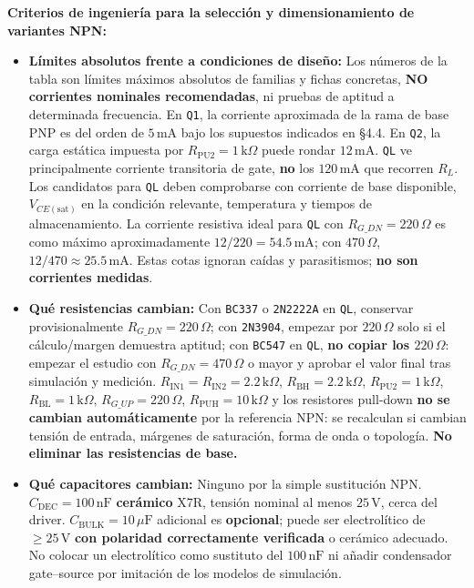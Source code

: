 \documentclass[10pt, a4paper, landscape]{article}
\begin{document}
\vspace{0.2cm}
\noindent
\textbf{Criterios de ingeniería para la selección y dimensionamiento de variantes NPN:}
\begin{itemize}[noitemsep, topsep=3pt]
    \item \textbf{Límites absolutos frente a condiciones de diseño:} Los números de la tabla son límites máximos absolutos de familias y fichas concretas, \textbf{NO corrientes nominales recomendadas}, ni pruebas de aptitud a determinada frecuencia. En \texttt{Q1}, la corriente aproximada de la rama de base PNP es del orden de $5\,\text{mA}$ bajo los supuestos indicados en \S 4.4. En \texttt{Q2}, la carga estática impuesta por $R_{\text{PU2}}=1\,\text{k}\Omega$ puede rondar $12\,\text{mA}$. \texttt{QL} ve principalmente corriente transitoria de gate, \textbf{no} los $120\,\text{mA}$ que recorren $R_L$. Los candidatos para \texttt{QL} deben comprobarse con corriente de base disponible, $V_{CE(\text{sat})}$ en la condición relevante, temperatura y tiempos de almacenamiento. La corriente resistiva ideal para \texttt{QL} con $R_{G\_DN}=220\,\Omega$ es como máximo aproximadamente $12/220 = 54.5\,\text{mA}$; con \textbf{$470\,\Omega$}, $12/470 \approx 25.5\,\text{mA}$. Estas cotas ignoran caídas y parasitismos; \textbf{no son corrientes medidas}.
    \item \textbf{Qué resistencias cambian:} Con \texttt{BC337} o \texttt{2N2222A} en \texttt{QL}, conservar provisionalmente $R_{G\_DN}=220\,\Omega$; con \texttt{2N3904}, empezar por $220\,\Omega$ solo si el cálculo/margen demuestra aptitud; con \texttt{BC547} en \texttt{QL}, \textbf{no copiar los $220\,\Omega$}: empezar el estudio con $R_{G\_DN}=470\,\Omega$ o mayor y aprobar el valor final tras simulación y medición. $R_{\text{IN1}}=R_{\text{IN2}}=2.2\,\text{k}\Omega$, $R_{\text{BH}}=2.2\,\text{k}\Omega$, $R_{\text{PU2}}=1\,\text{k}\Omega$, $R_{\text{BL}}=1\,\text{k}\Omega$, $R_{G\_UP}=220\,\Omega$, $R_{\text{PUH}}=10\,\text{k}\Omega$ y los resistores pull-down \textbf{no se cambian automáticamente} por la referencia NPN: se recalculan si cambian tensión de entrada, márgenes de saturación, forma de onda o topología. \textbf{No eliminar las resistencias de base.}
    \item \textbf{Qué capacitores cambian:} Ninguno por la simple sustitución NPN. $C_{\text{DEC}}=100\,\text{nF}$ \textbf{cerámico} X7R, tensión nominal al menos $25\,\text{V}$, cerca del driver. $C_{\text{BULK}}=10\,\mu\text{F}$ adicional es \textbf{opcional}; puede ser electrolítico de $\ge 25\,\text{V}$ \textbf{con polaridad correctamente verificada} o cerámico adecuado. No colocar un electrolítico como sustituto del $100\,\text{nF}$ ni añadir condensador gate--source por imitación de los modelos de simulación.

\end{itemize}
\end{document}

